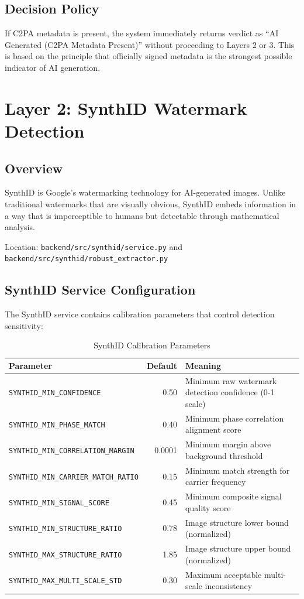 \documentclass[12pt,a4paper]{book}
\begin{document}
\subsection{Decision Policy}
If C2PA metadata is present, the system immediately returns verdict as ``AI Generated (C2PA Metadata Present)'' without proceeding to Layers 2 or 3. This is based on the principle that officially signed metadata is the strongest possible indicator of AI generation.

\section{Layer 2: SynthID Watermark Detection}
\label{sec:synthid}

\subsection{Overview}
SynthID is Google's watermarking technology for AI-generated images. Unlike traditional watermarks that are visually obvious, SynthID embeds information in a way that is imperceptible to humans but detectable through mathematical analysis.

Location: \texttt{backend/src/synthid/service.py} and \texttt{backend/src/synthid/robust\_extractor.py}

\subsection{SynthID Service Configuration}
The SynthID service contains calibration parameters that control detection sensitivity:

\begin{table}[H]
\centering
\captionsetup{justification=centering}
\caption{SynthID Calibration Parameters}
\begin{tabular}{|l|r|p{5cm}|}
\hline
\textbf{Parameter} & \textbf{Default} & \textbf{Meaning} \\
\hline
\texttt{SYNTHID\_MIN\_CONFIDENCE} & 0.50 & Minimum raw watermark detection confidence (0-1 scale) \\
\hline
\texttt{SYNTHID\_MIN\_PHASE\_MATCH} & 0.40 & Minimum phase correlation alignment score \\
\hline
\texttt{SYNTHID\_MIN\_CORRELATION\_MARGIN} & 0.0001 & Minimum margin above background threshold \\
\hline
\texttt{SYNTHID\_MIN\_CARRIER\_MATCH\_RATIO} & 0.15 & Minimum match strength for carrier frequency \\
\hline
\texttt{SYNTHID\_MIN\_SIGNAL\_SCORE} & 0.45 & Minimum composite signal quality score \\
\hline
\texttt{SYNTHID\_MIN\_STRUCTURE\_RATIO} & 0.78 & Image structure lower bound (normalized) \\
\hline
\texttt{SYNTHID\_MAX\_STRUCTURE\_RATIO} & 1.85 & Image structure upper bound (normalized) \\
\hline
\texttt{SYNTHID\_MAX\_MULTI\_SCALE\_STD} & 0.30 & Maximum acceptable multi-scale inconsistency \\
\hline
\end{tabular}
\end{table}
\end{document}
